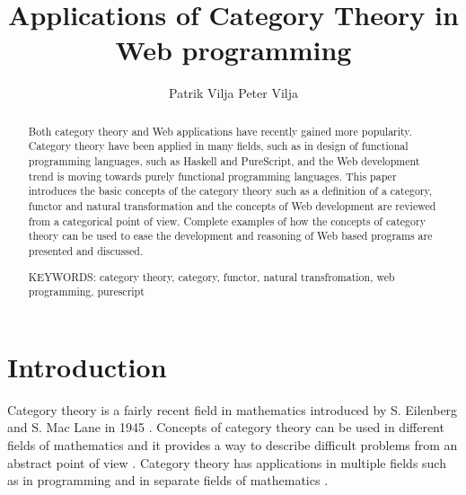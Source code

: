 \documentclass[article]{aaltoseries}
\begin{document}
 

\title{Applications of Category Theory in Web programming}

\author{Patrik Vilja Peter Vilja} %


\maketitle


\begin{abstract}
  Both category theory and Web applications have recently gained more
  popularity. Category theory have been applied in many fields, such as in
  design of functional programming languages, such as Haskell and PureScript,
  and the Web development trend is moving towards purely functional programming
  languages. This paper introduces the basic concepts of the category theory
  such as a definition of a category, functor and natural transformation and the
  concepts of Web development are reviewed from a categorical point of view.
  Complete examples of how the concepts of category theory can be used to ease
  the development and reasoning of Web based programs are presented and discussed.

\vspace{3mm}
\noindent KEYWORDS: category theory, category, functor, natural transfromation,
web programming, purescript 

\end{abstract}



\section{Introduction}

  Category theory is a fairly recent field in mathematics introduced by S.
  Eilenberg and S. Mac Lane in 1945 \cite{eilenberg1945general,
    awodey2006category}. Concepts of category theory can be used in different
  fields of mathematics and it provides a way to describe difficult problems
  from an abstract point of view \cite{eilenberg1945general, mclarty2007last}.
  Category theory has applications in multiple fields such as in programming and
  in separate fields of mathematics \cite{awodey2006category, reynolds1980using,
    jones1993glasgow}. 
\end{document}
